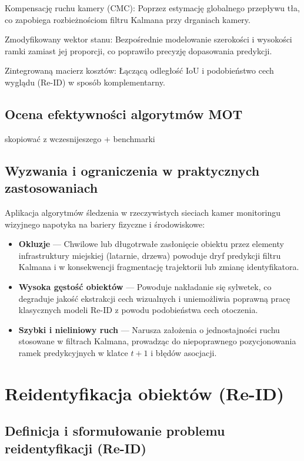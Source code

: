 Kompensację ruchu kamery (CMC): Poprzez estymację globalnego przepływu tła, co zapobiega
rozbieżnościom filtru Kalmana przy drganiach kamery.

Zmodyfikowany wektor stanu: Bezpośrednie modelowanie szerokości i wysokości ramki zamiast jej
proporcji, co poprawiło precyzję dopasowania predykcji.

Zintegrowaną macierz kosztów: Łączącą odległość IoU i podobieństwo cech wyglądu (Re-ID) w sposób
komplementarny.

\subsection{Ocena efektywności algorytmów MOT}
skopiować z wczesnijeszego + benchmarki

\subsection{Wyzwania i ograniczenia w praktycznych zastosowaniach}

Aplikacja algorytmów śledzenia w rzeczywistych sieciach kamer monitoringu wizyjnego napotyka na
bariery fizyczne i środowiskowe:
\begin{itemize}
  \item \textbf{Okluzje} — Chwilowe lub długotrwałe zasłonięcie obiektu przez elementy infrastruktury miejskiej (latarnie, drzewa) powoduje dryf predykcji filtru Kalmana i w konsekwencji fragmentację trajektorii lub zmianę identyfikatora.
  \item \textbf{Wysoka gęstość obiektów} — Powoduje nakładanie się sylwetek, co degraduje jakość ekstrakcji cech wizualnych i uniemożliwia poprawną pracę klasycznych modeli Re-ID z powodu podobieństwa cech otoczenia.
  \item \textbf{Szybki i nieliniowy ruch} — Narusza założenia o jednostajności ruchu stosowane w filtrach Kalmana, prowadząc do niepoprawnego pozycjonowania ramek predykcyjnych w klatce $t+1$ i błędów asocjacji.
\end{itemize}


\section{Reidentyfikacja obiektów (Re-ID)}
\label{sec:reidentyfikacja_reid}

\subsection{Definicja i sformułowanie problemu reidentyfikacji (Re-ID)}
\label{subsec:definicja_reid}

